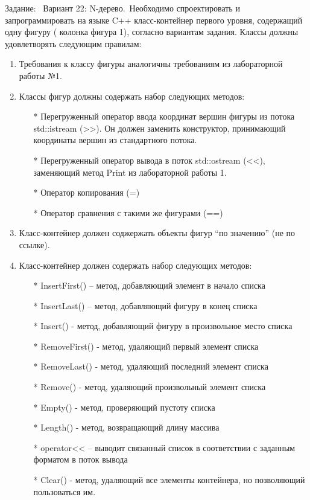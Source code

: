 \documentclass[12pt]{article}
\begin{document}
Задание: \
Вариант 22: N-дерево.\
Необходимо спроектировать и запрограммировать на языке C++ класс-контейнер первого уровня, содержащий одну фигуру ( колонка фигура 1), согласно вариантам задания. Классы должны удовлетворять следующим правилам:
\begin{enumerate}
\item Требования к классу фигуры аналогичны требованиям из лабораторной работы №1.
\item Классы фигур должны содержать набор следующих методов:
\begin{itemsize}
\begin{enumerate}
    \item[*] Перегруженный оператор ввода координат вершин фигуры из потока std::istream (>>). Он должен заменить конструктор, принимающий координаты вершин из стандартного потока.
    \item[*] Перегруженный оператор вывода в поток std::ostream (<<), заменяющий метод Print из лабораторной работы 1. 
    \item[*] Оператор копирования (=)
    \item[*] Оператор сравнения с такими же фигурами (==)
\end{enumerate}
\end{itemsize}
\item Класс-контейнер должен соджержать объекты фигур “по значению” (не по ссылке).
\item Класс-контейнер должен содержать набор следующих методов:
\begin{itemsize}
\begin{enumerate}

    \item[*] InsertFirst() – метод, добавляющий элемент в начало списка
    \item[*] InsertLast() – метод, добавляющий фигуру в конец списка
    \item[*] Insert() - метод, добавляющий фигуру в произвольное место списка
    \item[*] RemoveFirst() - метод, удаляющий первый элемент списка
    \item[*] RemoveLast() - метод, удаляющий последний элемент списка
    \item[*] Remove() - метод, удаляющий произвольный элемент списка
    \item[*] Empty() - метод, проверяющий пустоту списка
    \item[*] Length() - метод, возвращающий длину массива
    \item[*] operator<< – выводит связанный список в соответствии с заданным форматом в поток вывода
    \item[*] Clear() - метод, удаляющий все элементы контейнера, но позволяющий пользоваться им.
\end{enumerate}
\end{itemsize}
\end{enumerate}
\end{document}
